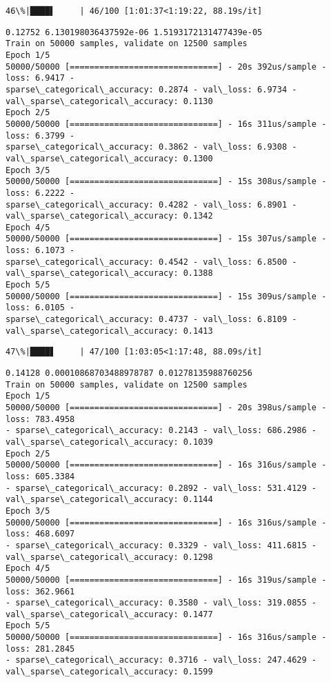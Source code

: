 \documentclass[11pt]{article}
\begin{document}
    \begin{Verbatim}[commandchars=\\\{\}]
 46\%|████▌     | 46/100 [1:01:37<1:19:22, 88.19s/it]
    \end{Verbatim}

    \begin{Verbatim}[commandchars=\\\{\}]
0.12752 6.130198036437592e-06 1.5193172131477439e-05
Train on 50000 samples, validate on 12500 samples
Epoch 1/5
50000/50000 [==============================] - 20s 392us/sample - loss: 6.9417 -
sparse\_categorical\_accuracy: 0.2874 - val\_loss: 6.9734 -
val\_sparse\_categorical\_accuracy: 0.1130
Epoch 2/5
50000/50000 [==============================] - 16s 311us/sample - loss: 6.3799 -
sparse\_categorical\_accuracy: 0.3862 - val\_loss: 6.9308 -
val\_sparse\_categorical\_accuracy: 0.1300
Epoch 3/5
50000/50000 [==============================] - 15s 308us/sample - loss: 6.2222 -
sparse\_categorical\_accuracy: 0.4282 - val\_loss: 6.8901 -
val\_sparse\_categorical\_accuracy: 0.1342
Epoch 4/5
50000/50000 [==============================] - 15s 307us/sample - loss: 6.1073 -
sparse\_categorical\_accuracy: 0.4542 - val\_loss: 6.8500 -
val\_sparse\_categorical\_accuracy: 0.1388
Epoch 5/5
50000/50000 [==============================] - 15s 309us/sample - loss: 6.0105 -
sparse\_categorical\_accuracy: 0.4737 - val\_loss: 6.8109 -
val\_sparse\_categorical\_accuracy: 0.1413
    \end{Verbatim}

    \begin{Verbatim}[commandchars=\\\{\}]
 47\%|████▋     | 47/100 [1:03:05<1:17:48, 88.09s/it]
    \end{Verbatim}

    \begin{Verbatim}[commandchars=\\\{\}]
0.14128 0.00010868703488978787 0.01278135988760256
Train on 50000 samples, validate on 12500 samples
Epoch 1/5
50000/50000 [==============================] - 20s 398us/sample - loss: 783.4958
- sparse\_categorical\_accuracy: 0.2143 - val\_loss: 686.2986 -
val\_sparse\_categorical\_accuracy: 0.1039
Epoch 2/5
50000/50000 [==============================] - 16s 316us/sample - loss: 605.3384
- sparse\_categorical\_accuracy: 0.2892 - val\_loss: 531.4129 -
val\_sparse\_categorical\_accuracy: 0.1144
Epoch 3/5
50000/50000 [==============================] - 16s 316us/sample - loss: 468.6097
- sparse\_categorical\_accuracy: 0.3329 - val\_loss: 411.6815 -
val\_sparse\_categorical\_accuracy: 0.1298
Epoch 4/5
50000/50000 [==============================] - 16s 319us/sample - loss: 362.9661
- sparse\_categorical\_accuracy: 0.3580 - val\_loss: 319.0855 -
val\_sparse\_categorical\_accuracy: 0.1477
Epoch 5/5
50000/50000 [==============================] - 16s 316us/sample - loss: 281.2845
- sparse\_categorical\_accuracy: 0.3716 - val\_loss: 247.4629 -
val\_sparse\_categorical\_accuracy: 0.1599
    \end{Verbatim}
\end{document}
